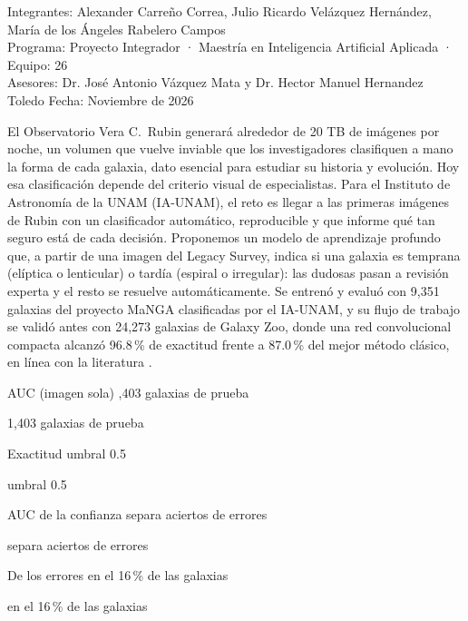 \documentclass[letterpaper,11pt]{article}
\newcommand{\cifra}[5]{%
  \begingroup\setlength{\fboxsep}{5pt}%
  \colorbox{#1}{\parbox[t]{\dimexpr\linewidth-2\fboxsep\relax}{%
    \setstretch{1}\color{#2}{\Large\bfseries #3}\par
    #4%
    \ifx\relax#5\relax\else\par{\footnotesize #5}\fi}}%
  \endgroup}
\newcommand{\cifragris}[4]{\cifra{black!8}{black}{#1}{#2}{#3}}
\newcommand{\cifraacento}[4]{\cifra{blue!10}{blue!55!black}{#1}{#2}{#3}}
\begin{document}
\thispagestyle{primera}

\smallskip
\noindent{\large\textcolor{black!60}{Resumen ejecutivo dirigido al Instituto de Astronomía de la UNAM}\par}
\medskip

\noindent\begingroup\setlength{\fboxsep}{7pt}%
\colorbox{black!8}{\parbox{\dimexpr\linewidth-2\fboxsep\relax}{\small{}%
\textcolor{black!60}{Integrantes:} Alexander Carreño Correa, Julio Ricardo Velázquez Hernández, María de los Ángeles Rabelero Campos\\
\textcolor{black!60}{Programa:} Proyecto Integrador · Maestría en Inteligencia Artificial Aplicada · \textcolor{black!60}{Equipo:} 26\\
\textcolor{black!60}{Asesores:} Dr. José Antonio Vázquez Mata y Dr. Hector Manuel Hernandez Toledo \quad \textcolor{black!60}{Fecha:} Noviembre de 2026}}%
\endgroup\par\medskip

\noindent El Observatorio Vera C.\ Rubin generará alrededor de 20 TB de imágenes por noche, un volumen que vuelve inviable que los investigadores clasifiquen a mano la forma de cada galaxia, dato esencial para estudiar su historia y evolución. Hoy esa clasificación depende del criterio visual de especialistas. Para el Instituto de Astronomía de la UNAM (IA-UNAM), el reto es llegar a las primeras imágenes de Rubin con un clasificador automático, reproducible y que informe qué tan seguro está de cada decisión. Proponemos un modelo de aprendizaje profundo que, a partir de una imagen del Legacy Survey, indica si una galaxia es temprana (elíptica o lenticular) o tardía (espiral o irregular): las dudosas pasan a revisión experta y el resto se resuelve automáticamente. Se entrenó y evaluó con 9,351 galaxias del proyecto MaNGA clasificadas por el IA-UNAM, y su flujo de trabajo se validó antes con 24,273 galaxias de Galaxy Zoo, donde una red convolucional compacta alcanzó 96.8\,\% de exactitud frente a 87.0\,\% del mejor método clásico, en línea con la literatura \parencite{barchi2020}.

\medskip
\noindent
\begin{minipage}[t]{0.235\linewidth}\cifraacento{0.962}{AUC (imagen sola)}{1,403 galaxias de prueba}{}\end{minipage}\hfill
\begin{minipage}[t]{0.235\linewidth}\cifragris{90\,\%}{Exactitud}{umbral 0.5}{}\end{minipage}\hfill
\begin{minipage}[t]{0.235\linewidth}\cifragris{0.88}{AUC de la confianza}{separa aciertos de errores}{}\end{minipage}\hfill
\begin{minipage}[t]{0.235\linewidth}\cifragris{48\,\%}{De los errores}{en el 16\,\% de las galaxias}{}\end{minipage}
\medskip
\end{document}
